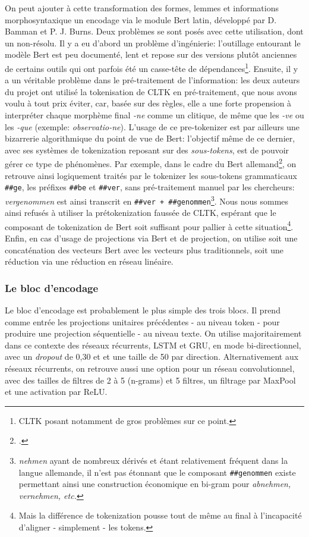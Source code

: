 On peut ajouter à cette transformation des formes, lemmes et informations morphosyntaxique un encodage via le module Bert latin, développé par D. Bamman et P. J. Burns. Deux problèmes se sont posés avec cette utilisation, dont un non-résolu. Il y a eu d'abord un problème d'ingénierie: l'outillage entourant le modèle Bert est peu documenté, lent et repose sur des versions plutôt anciennes de certains outils qui ont parfois été un casse-tête de dépendances\footnote{CLTK posant notamment de gros problèmes sur ce point.}. Ensuite, il y a un véritable problème dans le pré-traitement de l'information: les deux auteurs du projet ont utilisé la tokenisation de CLTK en pré-traitement, que nous avons voulu à tout prix éviter, car, basée sur des règles, elle a une forte propension à interpréter chaque morphème final \textit{-ne} comme un clitique, de même que les \textit{-ve} ou les \textit{-que} (exemple: \textit{observatio-ne}). L'usage de ce pre-tokenizer est par ailleurs une bizarrerie algorithmique du point de vue de Bert: l'objectif même de ce dernier, avec ses systèmes de tokenization reposant sur des \textit{sous-tokens}, est de pouvoir gérer ce type de phénomènes. Par exemple, dans le cadre du Bert allemand\footcite{chan_german_2019}, on retrouve ainsi logiquement traités par le tokenizer les sous-tokens grammaticaux \texttt{\#\#ge}, les préfixes \texttt{\#\#be} et \texttt{\#\#ver}, sans pré-traitement manuel par les chercheurs: \textit{vergenommen} est ainsi transcrit en \texttt{\#\#ver + \#\#genommen}\footnote{\textit{nehmen} ayant de nombreux dérivés et étant relativement fréquent dans la langue allemande, il n'est pas étonnant que le composant \texttt{\#\#genommen} existe permettant ainsi une construction économique en bi-gram pour \textit{abnehmen, vernehmen, etc.}}. Nous nous sommes ainsi refusés à utiliser la prétokenization faussée de CLTK, espérant que le composant de tokenization de Bert soit suffisant pour pallier à cette situation\footnote{Mais la différence de tokenization pousse tout de même au final à l'incapacité d'aligner - simplement - les tokens.}. Enfin, en cas d'usage de projections via Bert et de projection, on utilise soit une concaténation des vecteurs Bert avec les vecteurs plus traditionnels, soit une réduction via une réduction en réseau linéaire.

\subsubsection{Le bloc d'encodage}

Le bloc d'encodage est probablement le plus simple des trois blocs. Il prend comme entrée les projections unitaires précédentes - au niveau token - pour produire une projection séquentielle - au niveau texte. On utilise majoritairement dans ce contexte des réseaux récurrents, LSTM et GRU, en mode bi-directionnel, avec un \textit{dropout} de 0,30 et et une taille de 50 par direction. Alternativement aux réseaux récurrents, on retrouve aussi une option pour un réseau convolutionnel, avec des tailles de filtres de 2 à 5 (n-grams) et 5 filtres, un filtrage par MaxPool et une activation par ReLU.

